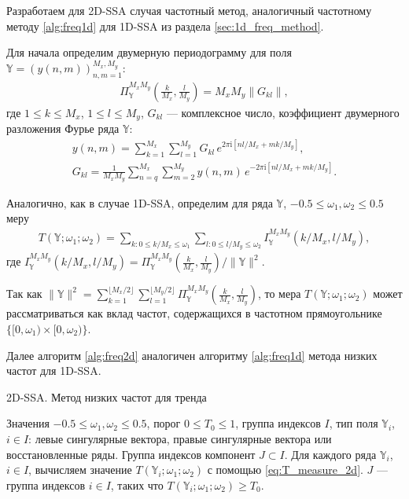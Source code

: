 \documentclass[specialist,
               substylefile = spbu.rtx,
               subf,href,colorlinks=true, 12pt]{disser}
\newcommand{\I}{\mathrm{i}}
\begin{document}
{{Разработаем для 2D-SSA случая частотный метод, аналогичный частотному методу \ref{alg:freq1d} для 1D-SSA из раздела \ref{sec:1d_freq_method}. 

Для начала определим двумерную периодограмму для поля $\mathbb{Y}=\left(y(n,m)\right)_{n,m=1}^{M_x, M_y}$:
\begin{gather*}
 \Pi_\mathbb{Y}^{M_x M_y} \left(\frac{k}{M_x}, \frac{l}{M_y}\right) = M_x M_y \|G_{kl}\|,
\end{gather*}
где $1 \leqslant k \leqslant M_x$, $1 \leqslant l \leqslant M_y$, $G_{kl}$ --- комплексное число, коэффициент двумерного разложения Фурье ряда $\mathbb{Y}$:
\begin{gather*}
y(n,m)=\sum_{k=1}^{M_x}\sum_{l=1}^{M_y} G_{kl}\, e^{2\pi\I \left[nl/M_x + mk/M_y\right]}, \\
 G_{kl}= \frac{1}{M_x M_y} \sum_{n=q}^{M_x}\sum_{m=2}^{M_y} y(n,m)\, e^{-2\pi\I \left[nl/M_x + mk/M_y\right]}.
\end{gather*}

Аналогично, как в случае 1D-SSA, определим для ряда $\mathbb{Y}$, $-0.5 \leqslant \omega_{1},  \omega_{2} \leqslant 0.5$ меру
\begin{gather}
\label{eq:T_measure_2d}
T(\mathbb{Y}; \omega_{1}; \omega_{2}) = \sum_{k: 0 \leqslant k/M_x \leqslant \omega_{1}} \sum_{l: 0 \leqslant l/M_y \leqslant \omega_{2}}  I_\mathbb{Y}^{M_x M_y}(k/M_x, l/M_y),
\end{gather}
где $I_\mathbb{Y}^{M_x M_y}(k/M_x, l/M_y) =\Pi_\mathbb{Y}^{M_x M_y} \left(\frac{k}{M_x}, \frac{l}{M_y}\right) / \|\mathbb{Y}\|^2$. 

Так как $\|\mathbb{Y}\|^2  =  \sum_{k=1}^{\lfloor M_x/2 \rfloor}  \sum_{l=1}^{\lfloor M_y/2 \rfloor}  \Pi_{\mathbb{Y}}^{M_x M_y} \left(\frac{k}{M_x}, \frac{l}{M_y}\right)$, то мера $T(\mathbb{Y}; \omega_{1}; \omega_{2}) $ может рассматриваться как вклад частот, содержащихся в частотном прямоугольнике $\{[0, \omega_{1}) \times [0, \omega_{2}) \}$.

Далее алгоритм \ref{alg:freq2d} аналогичен алгоритму \ref{alg:freq1d} метода низких частот для 1D-SSA.

 \begin{algorithm}[!hhh]
\caption{2D-SSA. Метод низких частот для тренда}
\label{alg:freq2d}
\begin{algorithmic}[1]
\REQUIRE Значения  $-0.5 \leqslant  \omega_1, \omega_2 \leqslant 0.5$, порог $0 \leqslant T_0 \leqslant 1$, группа индексов $I$, тип поля $\mathbb{Y}_i$, $i \in I$: левые сингулярные вектора, 
правые сингулярные вектора или восстановленные ряды.
\ENSURE Группа индексов компонент $J \subset I$.
\STATE  Для каждого ряда $\mathbb{Y}_i$, $i \in I$, вычисляем значение $T(\mathbb{Y}_i; \omega_{1}; \omega_{2})$ с помощью \eqref{eq:T_measure_2d}.
\STATE $J$ --- группа индексов $i \in I$, таких что $T(\mathbb{Y}_i; \omega_{1}; \omega_{2}) \geqslant T_0$.
\end{algorithmic}
\end{algorithm}

}}
\end{document}
